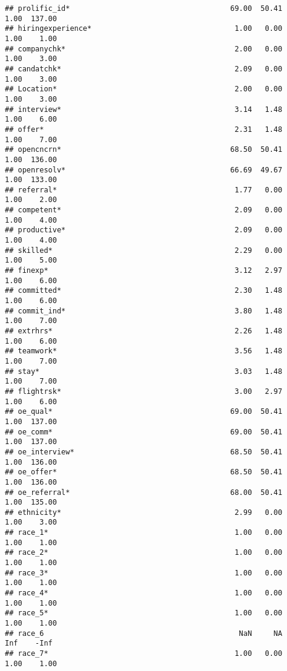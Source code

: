 \documentclass[]{article}
\begin{document}
\begin{verbatim}
## prolific_id*                                     69.00  50.41    1.00  137.00
## hiringexperience*                                 1.00   0.00    1.00    1.00
## companychk*                                       2.00   0.00    1.00    3.00
## candatchk*                                        2.09   0.00    1.00    3.00
## Location*                                         2.00   0.00    1.00    3.00
## interview*                                        3.14   1.48    1.00    6.00
## offer*                                            2.31   1.48    1.00    7.00
## opencncrn*                                       68.50  50.41    1.00  136.00
## openresolv*                                      66.69  49.67    1.00  133.00
## referral*                                         1.77   0.00    1.00    2.00
## competent*                                        2.09   0.00    1.00    4.00
## productive*                                       2.09   0.00    1.00    4.00
## skilled*                                          2.29   0.00    1.00    5.00
## finexp*                                           3.12   2.97    1.00    6.00
## committed*                                        2.30   1.48    1.00    6.00
## commit_ind*                                       3.80   1.48    1.00    7.00
## extrhrs*                                          2.26   1.48    1.00    6.00
## teamwork*                                         3.56   1.48    1.00    7.00
## stay*                                             3.03   1.48    1.00    7.00
## flightrsk*                                        3.00   2.97    1.00    6.00
## oe_qual*                                         69.00  50.41    1.00  137.00
## oe_comm*                                         69.00  50.41    1.00  137.00
## oe_interview*                                    68.50  50.41    1.00  136.00
## oe_offer*                                        68.50  50.41    1.00  136.00
## oe_referral*                                     68.00  50.41    1.00  135.00
## ethnicity*                                        2.99   0.00    1.00    3.00
## race_1*                                           1.00   0.00    1.00    1.00
## race_2*                                           1.00   0.00    1.00    1.00
## race_3*                                           1.00   0.00    1.00    1.00
## race_4*                                           1.00   0.00    1.00    1.00
## race_5*                                           1.00   0.00    1.00    1.00
## race_6                                             NaN     NA     Inf    -Inf
## race_7*                                           1.00   0.00    1.00    1.00

\end{verbatim}
\end{document}
